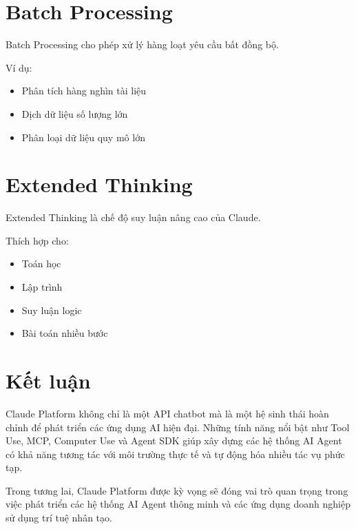 \documentclass[12pt]{article}
\begin{document}
\section{Batch Processing}

Batch Processing cho phép xử lý hàng loạt yêu cầu bất đồng bộ.

Ví dụ:

\begin{itemize}
    \item Phân tích hàng nghìn tài liệu
    \item Dịch dữ liệu số lượng lớn
    \item Phân loại dữ liệu quy mô lớn
\end{itemize}

\section{Extended Thinking}

Extended Thinking là chế độ suy luận nâng cao của Claude.

Thích hợp cho:

\begin{itemize}
    \item Toán học
    \item Lập trình
    \item Suy luận logic
    \item Bài toán nhiều bước
\end{itemize}



\section{Kết luận}

Claude Platform không chỉ là một API chatbot mà là một hệ sinh thái hoàn chỉnh để phát triển các ứng dụng AI hiện đại. Những tính năng nổi bật như Tool Use, MCP, Computer Use và Agent SDK giúp xây dựng các hệ thống AI Agent có khả năng tương tác với môi trường thực tế và tự động hóa nhiều tác vụ phức tạp.

Trong tương lai, Claude Platform được kỳ vọng sẽ đóng vai trò quan trọng trong việc phát triển các hệ thống AI Agent thông minh và các ứng dụng doanh nghiệp sử dụng trí tuệ nhân tạo.
\end{document}
